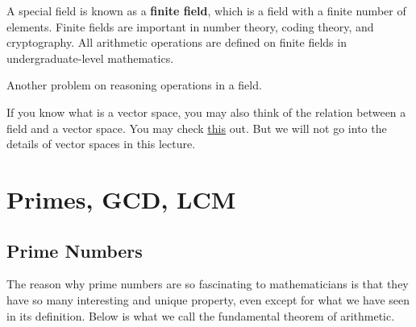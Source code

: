 \documentclass[oneside]{book}
\begin{document}
A special field is known as a \textbf{finite field}, which is a field with a finite number of elements. Finite fields are important in number theory, coding theory, and cryptography. All arithmetic operations are defined on finite fields in undergraduate-level mathematics.



Another problem on reasoning operations in a field.


If you know what is a vector space, you may also think of the relation between a field and a vector space. You may check \href{https://math.arizona.edu/~cais/223Page/hout/236w06fields.pdf}{this} out. But we will not go into the details of vector spaces in this lecture.

\chapter{Primes, GCD, LCM}

\section{Prime Numbers}


The reason why prime numbers are so fascinating to mathematicians is that they have so many interesting and unique property, even except for what we have seen in its definition. Below is what we call the fundamental theorem of arithmetic.
\end{document}
